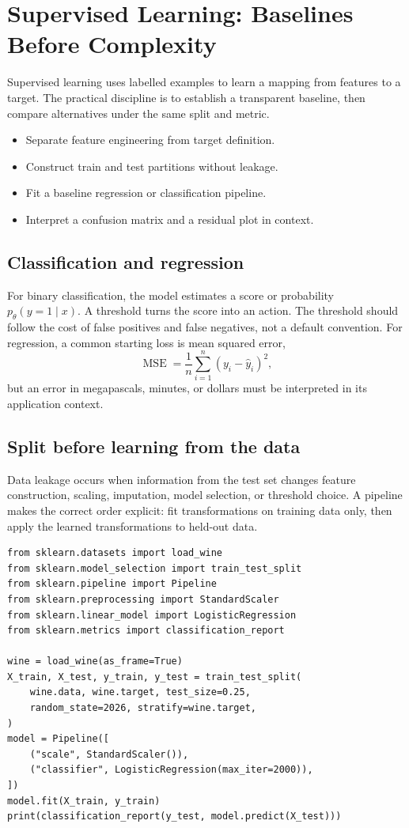 \chapter{Supervised Learning: Baselines Before Complexity}\label{chap:supervised}
 Supervised learning uses labelled examples to learn a mapping from features to a target. The practical discipline is to establish a transparent baseline, then compare alternatives under the same split and metric.

\begin{learningbox}
\begin{itemize}
  \item Separate feature engineering from target definition.
  \item Construct train and test partitions without leakage.
  \item Fit a baseline regression or classification pipeline.
  \item Interpret a confusion matrix and a residual plot in context.
\end{itemize}
\end{learningbox}

\section{Classification and regression}
For binary classification, the model estimates a score or probability $p_\theta(y=1\mid x)$. A threshold turns the score into an action. The threshold should follow the cost of false positives and false negatives, not a default convention. For regression, a common starting loss is mean squared error,
\[
  \operatorname{MSE}=\frac{1}{n}\sum_{i=1}^{n}(y_i-\hat{y}_i)^2,
\]
but an error in megapascals, minutes, or dollars must be interpreted in its application context.

\section{Split before learning from the data}
Data leakage occurs when information from the test set changes feature construction, scaling, imputation, model selection, or threshold choice. A pipeline makes the correct order explicit: fit transformations on training data only, then apply the learned transformations to held-out data.

\begin{lstlisting}
from sklearn.datasets import load_wine
from sklearn.model_selection import train_test_split
from sklearn.pipeline import Pipeline
from sklearn.preprocessing import StandardScaler
from sklearn.linear_model import LogisticRegression
from sklearn.metrics import classification_report

wine = load_wine(as_frame=True)
X_train, X_test, y_train, y_test = train_test_split(
    wine.data, wine.target, test_size=0.25,
    random_state=2026, stratify=wine.target,
)
model = Pipeline([
    ("scale", StandardScaler()),
    ("classifier", LogisticRegression(max_iter=2000)),
])
model.fit(X_train, y_train)
print(classification_report(y_test, model.predict(X_test)))
\end{lstlisting}

